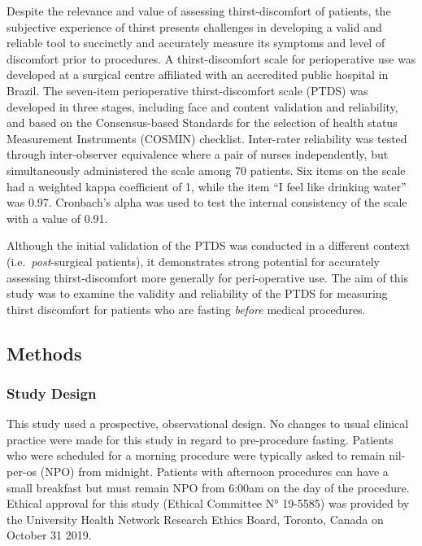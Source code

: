 \documentclass[letterpaper,9pt,twocolumn,twoside,]{pinp}
\begin{document}
Despite the relevance and value of assessing thirst-discomfort of
patients, the subjective experience of thirst presents challenges in
developing a valid and reliable tool to succinctly and accurately
measure its symptoms and level of discomfort prior to procedures. A
thirst-discomfort scale for perioperative use was developed at a
surgical centre affiliated with an accredited public hospital in
Brazil.\citep{Martins_2017} The seven-item perioperative
thirst-discomfort scale (PTDS) was developed in three stages, including
face and content validation and reliability, and based on the
Consensus-based Standards for the selection of health status Measurement
Instruments (COSMIN) checklist.\citep{mokkink2010cosmin} Inter-rater
reliability was tested through inter-observer equivalence where a pair
of nurses independently, but simultaneously administered the scale among
70 patients. Six items on the scale had a weighted kappa coefficient of
1, while the item ``I feel like drinking water'' was
0.97.\citep{Martins_2017} Cronbach's alpha was used to test the internal
consistency of the scale with a value of 0.91.\citep{Martins_2017}

Although the initial validation of the PTDS was conducted in a different
context (i.e.~\emph{post}-surgical patients), it demonstrates strong
potential for accurately assessing thirst-discomfort more generally for
peri-operative use. The aim of this study was to examine the validity
and reliability of the PTDS for measuring thirst discomfort for patients
who are fasting \emph{before} medical procedures.

\hypertarget{methods-1}{%
\subsection{Methods}\label{methods-1}}

\hypertarget{study-design}{%
\subsubsection{Study Design}\label{study-design}}

This study used a prospective, observational design. No changes to usual
clinical practice were made for this study in regard to pre-procedure
fasting. Patients who were scheduled for a morning procedure were
typically asked to remain nil-per-os (NPO) from midnight. Patients with
afternoon procedures can have a small breakfast but must remain NPO from
6:00am on the day of the procedure. Ethical approval for this study
(Ethical Committee N° 19-5585) was provided by the University Health
Network Research Ethics Board, Toronto, Canada on October 31 2019.
\end{document}
